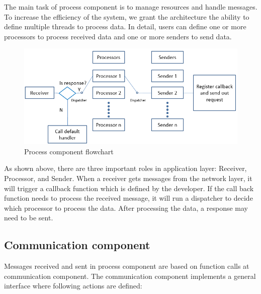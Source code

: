 \documentclass{Nan_Thesis}
\begin{document}
The main task of process component is to manage resources and handle messages. To increase the efficiency of the system, we grant the architecture the ability to define multiple threads to process data. In detail, users can define one or more processors to process received data and one or more senders to send data. 

\begin{figure}[h]
  \centering 
      \includegraphics[scale=0.8]{pic/processcomponentflowchart.png} 
  \caption{Process component flowchart}
\end{figure}

As shown above, there are three important roles in application layer: Receiver, Processor, and Sender. When a receiver gets messages from the network layer, it will trigger a callback function which is defined by the developer. If the call back function needs to process the received message, it will run a dispatcher to decide which processor to process the data. After processing the data, a response may need to be sent.

\subsection{Communication component}
Messages received and sent in process component are based on function calls at communication component. The communication component implements a general interface where following actions are defined:
\end{document}
